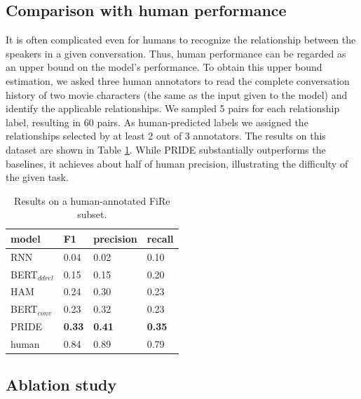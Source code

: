 \subsection{Comparison with human performance}

It is often complicated even for humans to recognize the relationship between the speakers in a given conversation. 
Thus, human performance can be regarded as an upper bound on the model's performance. 
To obtain this upper bound estimation, we asked three human annotators to read the complete conversation history of two movie characters (the same as the input given to the model) and identify the applicable relationships.
We sampled 5 pairs for each relationship label, resulting in 60 pairs. As human-predicted labels we assigned the relationships selected by at least 2 out of 3 annotators.
The results on this dataset are shown in Table \ref{tab:human_exp}.
While PRIDE substantially outperforms the baselines, it achieves about half of human precision, illustrating the difficulty of the given task.


\begin{table}[]
\centering
\begin{adjustbox}{width=0.45\textwidth}
\begin{tabular}{@{}l@{\hskip 0.5in}lll@{}}
\textbf{model}           & \textbf{F1}   & \textbf{precision} & \textbf{recall} \\ \toprule
RNN        & 0.04     & 0.02            & 0.10          \\
BERT$_{ddrel}$ & 0.15     & 0.15            & 0.20          \\
HAM        & 0.24     & 0.30             & 0.23         \\
BERT$_{conv}$  & 0.23     & 0.32            & 0.23         \\
PRIDE      & \textbf{0.33}     & \textbf{0.41}            & \textbf{0.35}         \\ \midrule
human      & 0.84     & 0.89            & 0.79        
\end{tabular}
\end{adjustbox}
\caption{Results on a human-annotated FiRe subset.}
\label{tab:human_exp}
\end{table}

\subsection{Ablation study}

